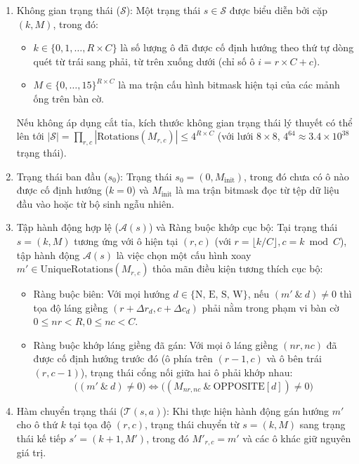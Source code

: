 \documentclass[a4paper]{article}
\begin{document}
\begin{enumerate}
    \item Không gian trạng thái ($\mathcal{S}$):
    Một trạng thái $s \in \mathcal{S}$ được biểu diễn bởi cặp $(k, M)$, trong đó:
    \begin{itemize}
        \item $k \in \{0, 1, \dots, R \times C\}$ là số lượng ô đã được cố định hướng theo thứ tự dòng quét từ trái sang phải, từ trên xuống dưới (chỉ số ô $i = r \times C + c$).
        \item $M \in \{0, \dots, 15\}^{R \times C}$ là ma trận cấu hình bitmask hiện tại của các mảnh ống trên bàn cờ.
    \end{itemize}
    Nếu không áp dụng cắt tỉa, kích thước không gian trạng thái lý thuyết có thể lên tới $|\mathcal{S}| = \prod_{r,c} |\text{Rotations}(M_{r,c})| \le 4^{R \times C}$ (với lưới $8 \times 8$, $4^{64} \approx 3.4 \times 10^{38}$ trạng thái).

    \item Trạng thái ban đầu ($s_0$):
    Trạng thái $s_0 = (0, M_{\text{init}})$, trong đó chưa có ô nào được cố định hướng ($k = 0$) và $M_{\text{init}}$ là ma trận bitmask đọc từ tệp dữ liệu đầu vào hoặc từ bộ sinh ngẫu nhiên.

    \item Tập hành động hợp lệ ($\mathcal{A}(s)$) và Ràng buộc khớp cục bộ:
    Tại trạng thái $s = (k, M)$ tương ứng với ô hiện tại $(r, c)$ (với $r = \lfloor k / C \rfloor, c = k \bmod C$), tập hành động $\mathcal{A}(s)$ là việc chọn một cấu hình xoay $m' \in \text{UniqueRotations}(M_{r,c})$ thỏa mãn điều kiện tương thích cục bộ:
    \begin{itemize}
        \item Ràng buộc biên: Với mọi hướng $d \in \{\text{N, E, S, W}\}$, nếu $(m' \ \& \ d) \neq 0$ thì tọa độ láng giềng $(r + \Delta r_d, c + \Delta c_d)$ phải nằm trong phạm vi bàn cờ $0 \le nr < R, 0 \le nc < C$.
        \item Ràng buộc khớp láng giềng đã gán: Với mọi ô láng giềng $(nr, nc)$ đã được cố định hướng trước đó (ô phía trên $(r-1, c)$ và ô bên trái $(r, c-1)$), trạng thái cổng nối giữa hai ô phải khớp nhau:
        \begin{equation}
            \big((m' \ \& \ d) \neq 0\big) \iff \big((M_{nr,nc} \ \& \ \text{OPPOSITE}[d]) \neq 0\big)
        \end{equation}
    \end{itemize}

    \item Hàm chuyển trạng thái ($\mathcal{T}(s, a)$):
    Khi thực hiện hành động gán hướng $m'$ cho ô thứ $k$ tại tọa độ $(r, c)$, trạng thái chuyển từ $s = (k, M)$ sang trạng thái kế tiếp $s' = (k + 1, M')$, trong đó $M'_{r,c} = m'$ và các ô khác giữ nguyên giá trị.


\end{enumerate}
\end{document}
